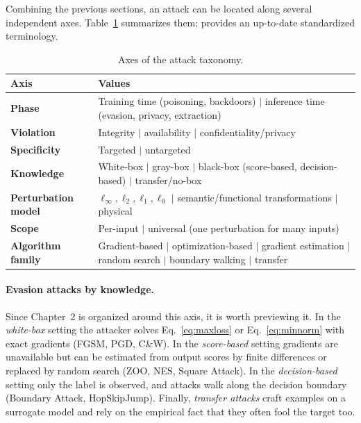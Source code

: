 \documentclass[10pt,a4paper]{extarticle}
\theoremstyle{definition}
\begin{document}
Combining the previous sections, an attack can be located along several independent axes. Table~\ref{tab:taxonomy} summarizes them; \citet{nist2025ai1002} provides an up-to-date standardized terminology.

\begin{table}[h]
\centering
\small
\begin{tabularx}{\textwidth}{>{\bfseries}l X}
\toprule
Axis & Values \\
\midrule
Phase & Training time (poisoning, backdoors) \(\mid\) inference time (evasion, privacy, extraction) \\
Violation & Integrity \(\mid\) availability \(\mid\) confidentiality/privacy \\
Specificity & Targeted \(\mid\) untargeted \\
Knowledge & White-box \(\mid\) gray-box \(\mid\) black-box (score-based, decision-based) \(\mid\) transfer/no-box \\
Perturbation model & \(\ell_\infty, \ell_2, \ell_1, \ell_0\) \(\mid\) semantic/functional transformations \(\mid\) physical \\
Scope & Per-input \(\mid\) universal (one perturbation for many inputs) \\
Algorithm family & Gradient-based \(\mid\) optimization-based \(\mid\) gradient estimation \(\mid\) random search \(\mid\) boundary walking \(\mid\) transfer \\
\bottomrule
\end{tabularx}
\caption{Axes of the attack taxonomy.}
\label{tab:taxonomy}
\end{table}

\paragraph{Evasion attacks by knowledge.} Since Chapter~2 is organized around this axis, it is worth previewing it. In the \emph{white-box} setting the attacker solves Eq.~\eqref{eq:maxloss} or Eq.~\eqref{eq:minnorm} with exact gradients (FGSM, PGD, C\&W). In the \emph{score-based} setting gradients are unavailable but can be estimated from output scores by finite differences or replaced by random search (ZOO, NES, Square Attack). In the \emph{decision-based} setting only the label is observed, and attacks walk along the decision boundary (Boundary Attack, HopSkipJump). Finally, \emph{transfer attacks} craft examples on a surrogate model and rely on the empirical fact that they often fool the target too.
\end{document}
